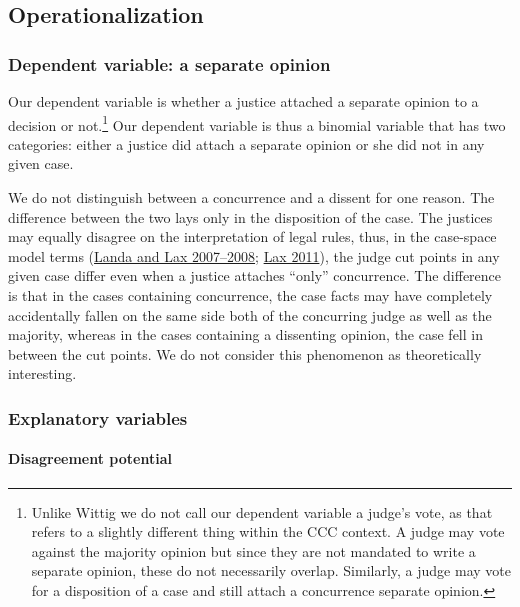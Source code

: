 \documentclass[
  11pt,
]{article}
\begin{document}
\hypertarget{operationalization}{%
\subsection{Operationalization}\label{operationalization}}

\hypertarget{dependent-variable-a-separate-opinion}{%
\subsubsection{Dependent variable: a separate
opinion}\label{dependent-variable-a-separate-opinion}}

Our dependent variable is whether a justice attached a separate opinion
to a decision or not.\footnote{Unlike Wittig we do not call our
  dependent variable a judge's vote, as that refers to a slightly
  different thing within the CCC context. A judge may vote against the
  majority opinion but since they are not mandated to write a separate
  opinion, these do not necessarily overlap. Similarly, a judge may vote
  for a disposition of a case and still attach a concurrence separate
  opinion.} Our dependent variable is thus a binomial variable that has
two categories: either a justice did attach a separate opinion or she
did not in any given case.

We do not distinguish between a concurrence and a dissent for one
reason. The difference between the two lays only in the disposition of
the case. The justices may equally disagree on the interpretation of
legal rules, thus, in the case-space model terms
(\protect\hyperlink{ref-landaDisagreementsCollegialCourts2007}{Landa and
Lax 2007--2008}; \protect\hyperlink{ref-laxNewJudicialPolitics2011}{Lax
2011}), the judge cut points in any given case differ even when a
justice attaches ``only'' concurrence. The difference is that in the
cases containing concurrence, the case facts may have completely
accidentally fallen on the same side both of the concurring judge as
well as the majority, whereas in the cases containing a dissenting
opinion, the case fell in between the cut points. We do not consider
this phenomenon as theoretically interesting.

\hypertarget{explanatory-variables}{%
\subsubsection{Explanatory variables}\label{explanatory-variables}}

\hypertarget{disagreement-potential}{%
\paragraph{Disagreement potential}\label{disagreement-potential}}
\end{document}
